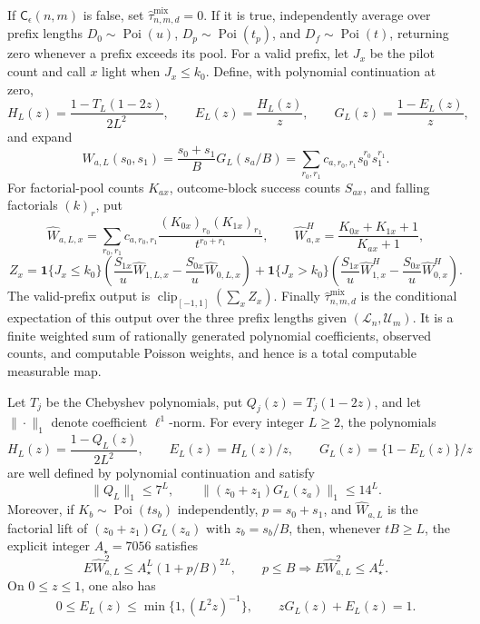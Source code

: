 If \(\mathsf C_\epsilon(n,m)\) is false, set \(\widehat\tau^{\mathrm{mix}}_{n,m,d}=0\).  If it is true, independently average over prefix lengths \(D_0\sim\operatorname{Poi}(u)\), \(D_p\sim\operatorname{Poi}(t_p)\), and \(D_f\sim\operatorname{Poi}(t)\), returning zero whenever a prefix exceeds its pool.  For a valid prefix, let \(J_x\) be the pilot count and call \(x\) light when \(J_x\le k_0\).  Define, with polynomial continuation at zero,
\[
 H_L(z)=\frac{1-T_L(1-2z)}{2L^2},\qquad
 E_L(z)=\frac{H_L(z)}z,\qquad G_L(z)=\frac{1-E_L(z)}z,
\]
and expand
\[
 W_{a,L}(s_0,s_1)=\frac{s_0+s_1}{B}G_L(s_a/B)
 =\sum_{r_0,r_1}c_{a,r_0,r_1}s_0^{r_0}s_1^{r_1}.
\]
For factorial-pool counts \(K_{ax}\), outcome-block success counts \(S_{ax}\), and falling factorials \((k)_r\), put
\[
 \widehat W_{a,L,x}=\sum_{r_0,r_1}c_{a,r_0,r_1}
 \frac{(K_{0x})_{r_0}(K_{1x})_{r_1}}{t^{r_0+r_1}},
 \qquad
 \widehat W^H_{a,x}=\frac{K_{0x}+K_{1x}+1}{K_{ax}+1},
\]
\[
 Z_x=\mathbf1\{J_x\le k_0\}
 \left(\frac{S_{1x}}u\widehat W_{1,L,x}-\frac{S_{0x}}u\widehat W_{0,L,x}\right)
 +\mathbf1\{J_x>k_0\}
 \left(\frac{S_{1x}}u\widehat W^H_{1,x}-\frac{S_{0x}}u\widehat W^H_{0,x}\right).
\]
The valid-prefix output is \(\operatorname{clip}_{[-1,1]}(\sum_xZ_x)\).  Finally \(\widehat\tau^{\mathrm{mix}}_{n,m,d}\) is the conditional expectation of this output over the three prefix lengths given \((\mathcal L_n,\mathcal U_m)\).  It is a finite weighted sum of rationally generated polynomial coefficients, observed counts, and computable Poisson weights, and hence is a total computable measurable map.

Let \(T_j\) be the Chebyshev polynomials, put \(Q_j(z)=T_j(1-2z)\), and let \(\|\cdot\|_1\) denote coefficient \(\ell^1\)-norm.  For every integer \(L\ge2\), the polynomials
\[
 H_L(z)=\frac{1-Q_L(z)}{2L^2},\qquad E_L(z)=H_L(z)/z,
 \qquad G_L(z)=\{1-E_L(z)\}/z
\]
are well defined by polynomial continuation and satisfy
\[
 \|Q_L\|_1\le7^L,\qquad
 \|(z_0+z_1)G_L(z_a)\|_1\le14^L.                                   \tag{C7}
\]
Moreover, if \(K_b\sim\operatorname{Poi}(ts_b)\) independently, \(p=s_0+s_1\), and \(\widehat W_{a,L}\) is the factorial lift of \((z_0+z_1)G_L(z_a)\) with \(z_b=s_b/B\), then, whenever \(tB\ge L\), the explicit integer \(A_\star=7056\) satisfies
\[
 E\widehat W_{a,L}^{2}\le A_\star^L(1+p/B)^{2L},
 \qquad
 p\le B\Longrightarrow E\widehat W_{a,L}^{2}\le A_\star^L.       \tag{C8}
\]
On \(0\le z\le1\), one also has
\[
 0\le E_L(z)\le\min\{1,(L^2z)^{-1}\},\qquad zG_L(z)+E_L(z)=1.     \tag{C9}
\]

